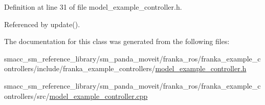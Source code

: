 Definition at line 31 of file model\+\_\+example\+\_\+controller.\+h.



Referenced by update().



The documentation for this class was generated from the following files\+:\begin{DoxyCompactItemize}
\item 
smacc\+\_\+sm\+\_\+reference\+\_\+library/sm\+\_\+panda\+\_\+moveit/franka\+\_\+ros/franka\+\_\+example\+\_\+controllers/include/franka\+\_\+example\+\_\+controllers/\hyperlink{model__example__controller_8h}{model\+\_\+example\+\_\+controller.\+h}\item 
smacc\+\_\+sm\+\_\+reference\+\_\+library/sm\+\_\+panda\+\_\+moveit/franka\+\_\+ros/franka\+\_\+example\+\_\+controllers/src/\hyperlink{model__example__controller_8cpp}{model\+\_\+example\+\_\+controller.\+cpp}\end{DoxyCompactItemize}
